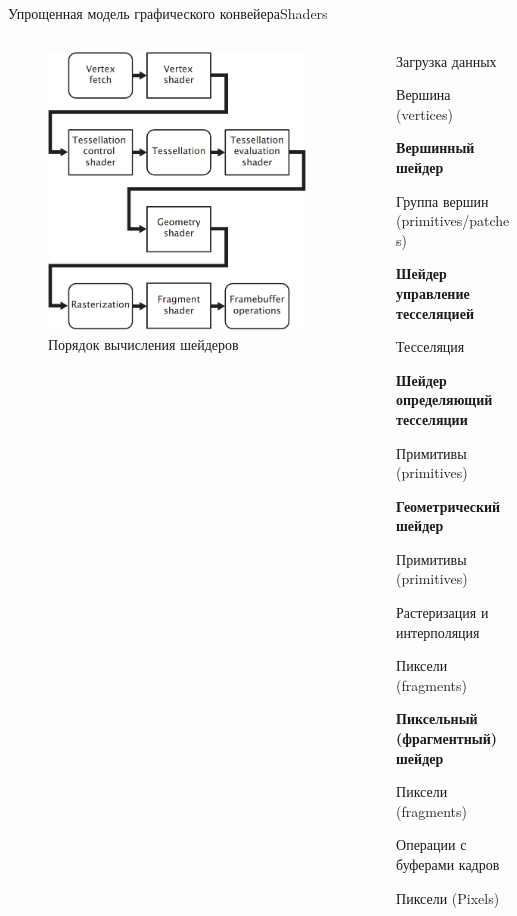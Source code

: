 \documentclass{beamer}
\begin{document}
\begin{frame}{Упрощенная модель графического конвейера}{Shaders}
	\begin{columns}
		\begin{column}{0.5\textwidth}
			\begin{figure} 
				\includegraphics[width=0.9\textwidth]{images/Simplified_model_of_the_graphics_pipeline.png}
				\caption {Порядок вычисления шейдеров}
			\end{figure}
		\end{column}
		\begin{column}{0.5\textwidth}
			
			{\footnotesize
			
			Загрузка данных
			
			{\hfill Вершина (vertices)}
			
			\textbf{Вершинный шейдер}
			
			{\hfill Группа вершин (primitives/patches)}
			
			\textbf{Шейдер управление тесселяцией}
			
			Тесселяция
			
			\textbf{Шейдер определяющий тесселяции}
			
			{\hfill Примитивы (primitives)}
			
			\textbf{Геометрический шейдер}
			
			{\hfill Примитивы (primitives)}
			
			Растеризация и интерполяция
			
			{\hfill Пиксели (fragments)}
			
			\textbf{Пиксельный (фрагментный) шейдер}
			
			{\hfill Пиксели (fragments)}
			
			Операции с буферами кадров
			
			{\hfill Пиксели (Pixels)}
		}
		\end{column}
	\end{columns}
	

\end{frame}
\end{document}
